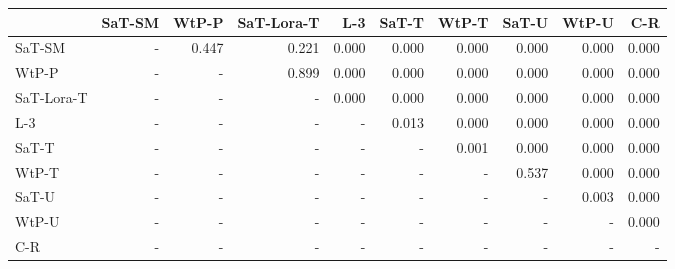 \begin{tabular}{lrrrrrrrrr}
\toprule
 & SaT-SM & WtP-P & SaT-Lora-T & L-3 & SaT-T & WtP-T & SaT-U & WtP-U & C-R \\
\midrule
SaT-SM & - & 0.447 & 0.221 & 0.000 & 0.000 & 0.000 & 0.000 & 0.000 & 0.000 \\
WtP-P & - & - & 0.899 & 0.000 & 0.000 & 0.000 & 0.000 & 0.000 & 0.000 \\
SaT-Lora-T & - & - & - & 0.000 & 0.000 & 0.000 & 0.000 & 0.000 & 0.000 \\
L-3 & - & - & - & - & 0.013 & 0.000 & 0.000 & 0.000 & 0.000 \\
SaT-T & - & - & - & - & - & 0.001 & 0.000 & 0.000 & 0.000 \\
WtP-T & - & - & - & - & - & - & 0.537 & 0.000 & 0.000 \\
SaT-U & - & - & - & - & - & - & - & 0.003 & 0.000 \\
WtP-U & - & - & - & - & - & - & - & - & 0.000 \\
C-R & - & - & - & - & - & - & - & - & - \\
\bottomrule
\end{tabular}

